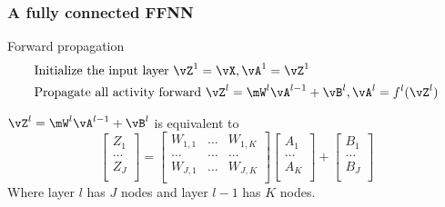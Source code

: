 \newcommand{\cA}{\mathcal{A}} \newcommand{\cB}{\mathcal{B}} \newcommand{\cC}{\mathcal{C}} \newcommand{\cD}{\mathcal{D}} \newcommand{\cE}{\mathcal{E}} \newcommand{\cF}{\mathcal{F}} \newcommand{\cG}{\mathcal{G}} \newcommand{\cH}{\mathcal{H}} \newcommand{\cI}{\mathcal{I}} \newcommand{\cJ}{\mathcal{J}} \newcommand{\cK}{\mathcal{K}} \newcommand{\cL}{\mathcal{L}} \newcommand{\cM}{\mathcal{M}} \newcommand{\cN}{\mathcal{N}} \newcommand{\cO}{\mathcal{O}} \newcommand{\cP}{\mathcal{P}} \newcommand{\cQ}{\mathcal{Q}} \newcommand{\cR}{\mathcal{R}} \newcommand{\cS}{\mathcal{S}} \newcommand{\cT}{\mathcal{T}} \newcommand{\cU}{\mathcal{U}} \newcommand{\cV}{\mathcal{V}} \newcommand{\cW}{\mathcal{W}} \newcommand{\cX}{\mathcal{X}} \newcommand{\cY}{\mathcal{Y}} \newcommand{\cZ}{\mathcal{Z}}

\newcommand{\ewise}[2]{{#1 * #2}} %


\subsubsection {A fully connected FFNN} \label {sec: fcffnn}
Forward propagation
\begin {equation} \begin {split}
& \text {Initialize the input layer } \vZ^1 = \vX, \vA^1 = \vZ^1 \\
& \text {Propagate all activity forward } \vZ^l = \mW^l \vA^{l-1} + \vB^l, \vA^l = f^l(\vZ^l) \\
\end {split} \end {equation}

$\vZ^l = \mW^l \vA^{l-1} + \vB^l$ is equivalent to 
\begin{equation} \label {eq: nnwts}
\begin{bmatrix}
Z_1 \\
\ldots \\
Z_J \\
\end{bmatrix}
= 
\begin{bmatrix}
W_{1,1} & \ldots & W_{1,K} \\
\ldots & \ldots & \ldots \\
W_{J,1} & \ldots & W_{J,K} \\
\end{bmatrix}
\begin{bmatrix}
A_1 \\
\ldots \\
A_K \\
\end{bmatrix} 
+
\begin{bmatrix}
B_1 \\
\ldots \\
B_J \\
\end{bmatrix}
\end{equation}
Where layer $l$ has $J$ nodes and layer $l-1$ has $K$ nodes.

